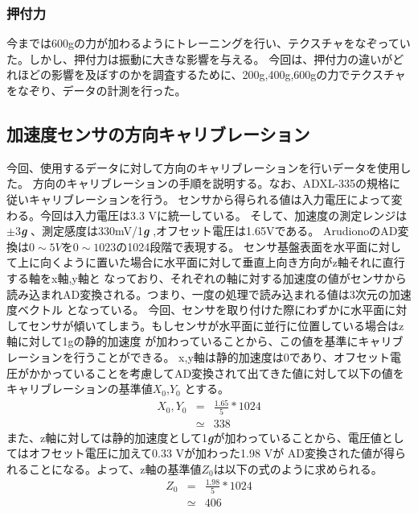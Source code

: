 \subsubsection{押付力}
	今までは600gの力が加わるようにトレーニングを行い、テクスチャをなぞっていた。しかし、押付力は振動に大きな影響を与える。
	今回は、押付力の違いがどれほどの影響を及ぼすのかを調査するために、200g,400g,600gの力でテクスチャをなぞり、データの計測を行った。


\subsection{加速度センサの方向キャリブレーション}
		今回、使用するデータに対して方向のキャリブレーションを行いデータを使用した。
		方向のキャリブレーションの手順を説明する。なお、ADXL-335の規格に従いキャリブレーションを行う。
		センサから得られる値は入力電圧によって変わる。今回は入力電圧は3.3 Vに統一している。
		そして、加速度の測定レンジは${\pm}3$\textit{\textbf{g}} 、測定感度は330mV/1\textit{\textbf{g}} ,オフセット電圧は1.65Vである。
		ArudionoのAD変換は$0{\sim}5 V$を$0{\sim}1023$の1024段階で表現する。
		センサ基盤表面を水平面に対して上に向くように置いた場合に水平面に対して垂直上向き方向がz軸それに直行する軸をx軸,y軸と
		なっており、それぞれの軸に対する加速度の値がセンサから読み込まれAD変換される。つまり、一度の処理で読み込まれる値は3次元の加速度ベクトル
		となっている。
		今回、センサを取り付けた際にわずかに水平面に対してセンサが傾いてしまう。もしセンサが水平面に並行に位置している場合はz軸に対して1gの静的加速度
		が加わっていることから、この値を基準にキャリブレーションを行うことができる。
		x,y軸は静的加速度は0であり、オフセット電圧がかかっていることを考慮してAD変換されて出てきた値に対して以下の値をキャリブレーションの基準値$X_{0}$,$Y_{0}$
		とする。
		\begin{eqnarray*}
		 		X_{0},Y_{0}&= &\frac{1.65}{5}*1024\\
		 				   &\simeq &338
		\end{eqnarray*}
		また、z軸に対しては静的加速度として1\textit{\textbf{g}}が加わっていることから、電圧値としてはオフセット電圧に加えて0.33 Vが加わった1.98 Vが
		AD変換された値が得られることになる。よって、z軸の基準値$Z_{0}$は以下の式のように求められる。
		\begin{eqnarray*}
			Z_{0}&= & \frac{1.98}{5}*1024\\
			     &\simeq &406
		\end{eqnarray*}

